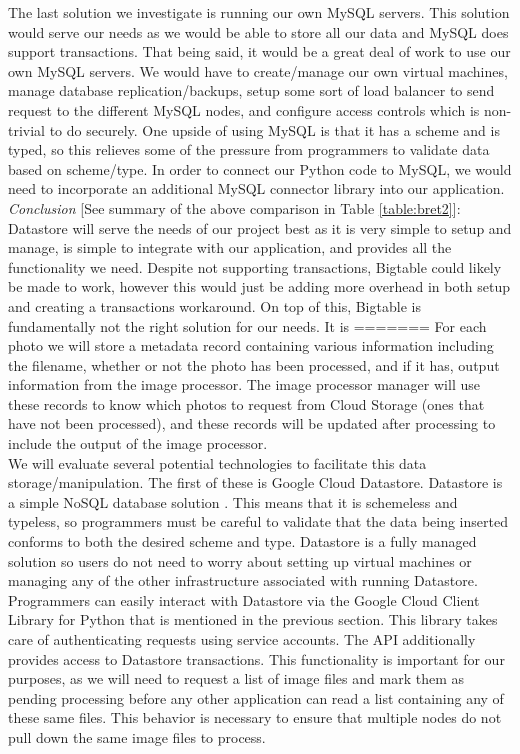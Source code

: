 \documentclass[10pt, onecolumn, draftclsnofoot, letterpaper, compsoc]{IEEEtran}
\begin{document}
The last solution we investigate is running our own MySQL servers. This solution
would serve our needs as we would be able to store all our data and MySQL
does support transactions. That being said, it would be a great deal of work to
use our own MySQL servers. We would have to create/manage our own virtual machines,
manage database replication/backups, setup some sort of load balancer to send
request to the different MySQL nodes, and configure access controls which is
non-trivial to do securely. One upside of using MySQL is that it has a scheme
and is typed, so this relieves some of the pressure from programmers to
validate data based on scheme/type. In order to connect our Python code to MySQL,
we would need to incorporate an additional MySQL connector library into our
application\cite{mysql}. \\

\textit{Conclusion} [See summary of the above comparison in Table \ref{table:bret2}]:
Datastore will serve the needs of our project best as it is
very simple to setup and manage, is simple to integrate with our application,
and provides all the functionality we need. Despite not supporting transactions,
Bigtable could likely be made to work, however this would just be adding more
overhead in both setup and creating a transactions workaround. On top of this,
Bigtable is fundamentally not the right solution for our needs. It is
=======
For each photo we will store a metadata record containing various information
including the filename, whether or not the photo has been processed, and if it
has, output information from the image processor. The image processor manager
will use these records to know which photos to request from Cloud Storage
(ones that have not been processed), and these records will be updated after
processing to include the output of the image processor. \\

We will evaluate several potential technologies to facilitate this data
storage/manipulation. The first of these is Google Cloud Datastore. Datastore
is a simple NoSQL database solution \cite{cloudDatastore}. This means that it is
schemeless and typeless, so programmers must be careful to validate that the
data being inserted conforms to both the desired scheme and type.
Datastore is a fully managed solution so users do not need to worry about setting
up virtual machines or managing any of the other infrastructure associated with
running Datastore\cite{cloudDatastore}. Programmers can easily interact with Datastore
via the Google Cloud Client Library for Python that is mentioned in the previous
section\cite{cloudDatastoreDocs}. This library takes care of authenticating requests
using service accounts\cite{cloudDatastoreDocs}. The API additionally provides access
to Datastore transactions\cite{cloudDatastoreDocs}. This functionality is important for
our purposes, as we will need to request a list of image files and mark them as pending
processing before any other application can read a list containing any of these same files.
This behavior is necessary to ensure that multiple nodes do not pull down the same image
files to process. \\
\end{document}
